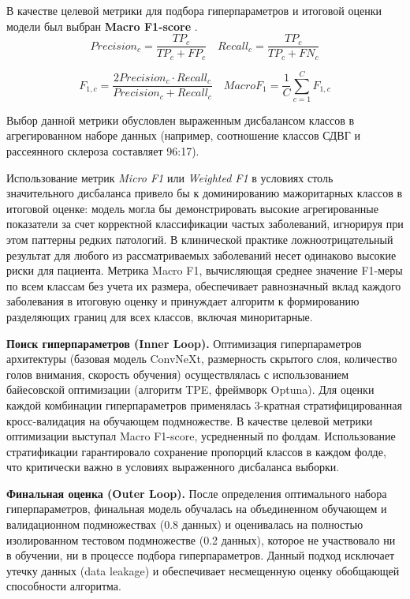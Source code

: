 \documentclass[eqsecnum, authorsinfo]{kioj6}
\begin{document}
В качестве целевой метрики для подбора гиперпараметров и итоговой оценки модели был выбран \textbf{Macro F1-score} \cite{measuresforclassificationtasks}. 
\begin{equation*}
Precision_c = \dfrac{TP_c}{TP_c + FP_c} \quad Recall_c = \dfrac{TP_c}{TP_c + FN_c}
\end{equation*}

\begin{equation*}
F_{1, c} = \dfrac{2Precision_c \cdot Recall_c}{Precision_c + Recall_c} \quad
MacroF_1 = \dfrac{1}{C}\sum_{c=1}^{C}{F_{1, c}}
\end{equation*}

Выбор данной метрики обусловлен выраженным 
дисбалансом классов в агрегированном наборе данных (например, соотношение классов СДВГ и рассеянного склероза составляет 96:17). 

Использование метрик \textit{Micro F1} \cite{measuresforclassificationtasks} или \textit{Weighted F1} \cite{measuresforclassificationtasks} в условиях столь значительного дисбаланса привело бы к доминированию 
мажоритарных классов в итоговой оценке: модель могла бы демонстрировать высокие агрегированные показатели за счет корректной классификации 
частых заболеваний, игнорируя при этом паттерны редких патологий. В клинической практике ложноотрицательный результат для любого из рассматриваемых заболеваний 
несет одинаково высокие риски для пациента. Метрика Macro F1\cite{measuresforclassificationtasks}, вычисляющая среднее значение F1-меры по всем классам без учета их размера, обеспечивает 
равнозначный вклад каждого заболевания в итоговую оценку и принуждает алгоритм к формированию разделяющих границ для всех классов, включая миноритарные.

\textbf{Поиск гиперпараметров (Inner Loop).} 
Оптимизация гиперпараметров архитектуры (базовая модель ConvNeXt\cite{liu2022convnet2020s}, размерность скрытого слоя, количество голов внимания, скорость обучения) осуществлялась с использованием 
байесовской оптимизации (алгоритм TPE, фреймворк Optuna\cite{optunaframework}). Для оценки каждой комбинации гиперпараметров применялась 3-кратная стратифицированная кросс-валидация на обучающем 
подмножестве. В качестве целевой метрики оптимизации выступал Macro F1-score, усредненный по фолдам. Использование стратификации 
гарантировало сохранение пропорций классов в каждом фолде, что критически важно в условиях выраженного дисбаланса выборки.

\textbf{Финальная оценка (Outer Loop).} 
После определения оптимального набора гиперпараметров, финальная модель обучалась на объединенном обучающем и валидационном подмножествах 
(0.8 данных) и оценивалась на полностью изолированном тестовом подмножестве (0.2 данных), которое не участвовало ни в обучении, ни в процессе подбора гиперпараметров. 
Данный подход исключает утечку данных (data leakage) и обеспечивает несмещенную оценку обобщающей способности алгоритма.
\end{document}
